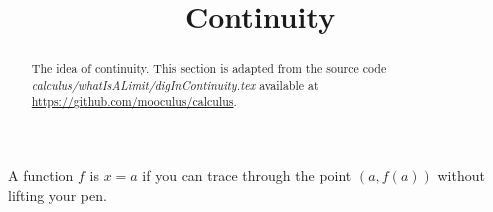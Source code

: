 \documentclass{ximera}
\title[Dig-In:]{Continuity}
\begin{document}
\begin{abstract}
The idea of continuity.
This section is adapted from the source code \emph{calculus/whatIsALimit/digInContinuity.tex} available at \url{https://github.com/mooculus/calculus}.
       
      

\end{abstract}
\maketitle
 

 
\begin{idea}
  A function $f$ is  $x=a$ if you can trace through the point $(a,f(a))$ without lifting your pen.

\end{idea}
\end{document}
